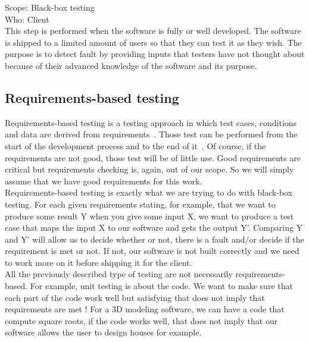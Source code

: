 \documentclass[12pt]{article}
\theoremstyle{definition}
\theoremstyle{definition}
\begin{document}
Scope: Black-box testing\\
Who: Client\\

This step is performed when the software is fully or well developed. The software is shipped to a limited amount of users so that they can test it as they wish. The purpose is to detect fault by providing inputs that testers have not thought about because of their advanced knowledge of the software and its purpose.

\subsection{Requirements-based testing}

Requirements-based testing is a testing approach in which test cases, conditions and data are derived from requirements~\cite{IBMRequirementBasedTesting:2017}. Those test can be performed from the start of the development process and to the end of it~\cite{BenderRBTRequirementBasedTesting:2017}. Of course, if the requirements are not good, those test will be of little use. Good requirements are critical but requirements checking is, again, out of our scope. So we will simply assume that we have good requirements for this work.\\

Requirements-based testing is exactly what we are trying to do with black-box testing. For each given requirements stating, for example, that we want to produce some result Y when you give some input X, we want to produce a test case that maps the input X to our software and gets the output Y'. Comparing Y and Y' will allow us to decide whether or not, there is a fault and/or decide if the requirement is met or not. If not, our software is not built correctly and we need to work more on it before shipping it for the client.\\

All the previously described type of testing are not necessarily requirements-based. For example, unit testing is about the code. We want to make sure that each part of the code work well but satisfying that does not imply that requirements are met ! For a 3D modeling software, we can have a code that compute square roots, if the code works well, that does not imply that our software allows the user to design houses for example.\\


\end{document}
